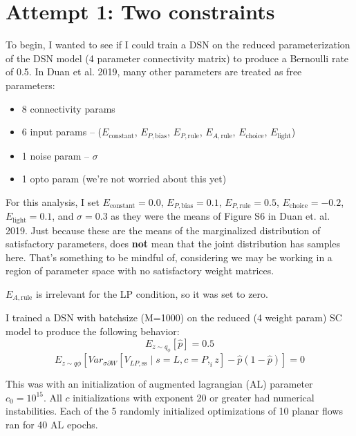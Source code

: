 \documentclass[11pt]{article}
\begin{document}
\section{Attempt 1: Two constraints}
To begin, I wanted to see if I could train a DSN on the reduced parameterization of the DSN model (4 parameter connectivity matrix) to produce a Bernoulli rate of 0.5.  In Duan et al. 2019, many other parameters are treated as free parameters: \\
\begin{itemize}
\item 8 connectivity params
\item 6 input params -- ($E_{\text{constant}}$, $E_{P,\text{bias}}$, $E_{P,\text{rule}}$, $E_{A,\text{rule}}$, $E_{\text{choice}}$, $E_{\text{light}}$)
\item 1 noise param -- $\sigma$
\item 1 opto param (we're not worried about this yet)
\end{itemize}
For this analysis, I set $E_{\text{constant}} = 0.0$, $E_{P,\text{bias}} = 0.1$, $E_{P,\text{rule}} = 0.5$, $E_{\text{choice}} = -0.2$, $E_{\text{light}} = 0.1$, and $\sigma = 0.3$ as they were the means of Figure S6 in Duan et. al. 2019.  Just because these are the means of the marginalized distribution of satisfactory parameters, does \textbf{not} mean that the joint distribution has samples here. That's something to be mindful of, considering we may be working in a region of parameter space with no satisfactory weight matrices.

 $E_{A,\text{rule}}$ is irrelevant for the LP condition, so it was set to zero.
 
I trained a DSN with batchsize (M=1000) on the reduced (4 weight param) SC model to produce the following behavior:
\[E_{z \sim q_\phi} \left[ \hat{p} \right] = 0.5\]
\[E_{z \sim q\phi} \left[ Var_{\sigma \partial W} \left[ V_{LP,\text{ss}} \mid s=L, c=P, _iz \right] - \hat{p}(1 - \hat{p}) \right] = 0\]

This was with an initialization of augmented lagrangian (AL) parameter $c_0 = 10^{15}$.  All $c$ initializations with exponent 20 or greater had numerical instabilities.  Each of the 5 randomly initialized optimizations of 10 planar flows ran for 40 AL epochs.
\end{document}

